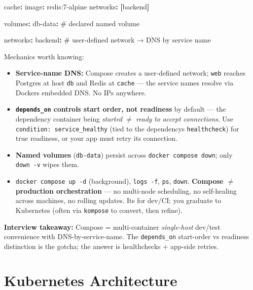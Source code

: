 \documentclass[11pt]{article}
\providecommand{\tightlist}{\setlength{\itemsep}{1pt}\setlength{\parskip}{0pt}}
\newenvironment{Shaded}{\begin{snugshade}}{\end{snugshade}}
\newcommand{\AttributeTok}[1]{\textcolor[rgb]{0.16,0.50,0.73}{#1}}
\newcommand{\CommentTok}[1]{\textcolor[rgb]{0.48,0.49,0.49}{#1}}
\newcommand{\FunctionTok}[1]{\textcolor[rgb]{0.56,0.27,0.68}{#1}}
\newcommand{\KeywordTok}[1]{\textcolor[rgb]{0.81,0.81,0.76}{\textbf{#1}}}
\begin{document}
\begin{Shaded}
\begin{Highlighting}[]
\AttributeTok{  }\FunctionTok{cache}\KeywordTok{:}
\AttributeTok{    }\FunctionTok{image}\KeywordTok{:}\AttributeTok{ redis:7{-}alpine}
\AttributeTok{    }\FunctionTok{networks}\KeywordTok{:}\AttributeTok{ }\KeywordTok{[}\AttributeTok{backend}\KeywordTok{]}

\FunctionTok{volumes}\KeywordTok{:}
\AttributeTok{  }\FunctionTok{db{-}data}\KeywordTok{:}\CommentTok{                          \# declared named volume}

\FunctionTok{networks}\KeywordTok{:}
\AttributeTok{  }\FunctionTok{backend}\KeywordTok{:}\CommentTok{                          \# user{-}defined network → DNS by service name}
\end{Highlighting}
\end{Shaded}

Mechanics worth knowing:

\begin{itemize}
\tightlist
\item
  \textbf{Service-name DNS:} Compose creates a user-defined network; \texttt{web} reaches Postgres at host \texttt{db} and Redis at \texttt{cache} --- the service names resolve via Docker\textquotesingle s embedded DNS. No IPs anywhere.
\item
  \textbf{\texttt{depends\_on} controls start order, not readiness} by default --- the dependency container being \emph{started} \(\neq\) \emph{ready to accept connections}. Use \texttt{condition:\ service\_healthy} (tied to the dependency\textquotesingle s \texttt{healthcheck}) for true readiness, or your app must retry its connection.
\item
  \textbf{Named volumes} (\texttt{db-data}) persist across \texttt{docker\ compose\ down}; only \texttt{down\ -v} wipes them.
\item
  \texttt{docker\ compose\ up\ -d} (background), \texttt{logs\ -f}, \texttt{ps}, \texttt{down}. \textbf{Compose \(\neq\) production orchestration} --- no multi-node scheduling, no self-healing across machines, no rolling updates. It\textquotesingle s for dev/CI; you graduate to Kubernetes (often via \texttt{kompose} to convert, then refine).
\end{itemize}

\textbf{Interview takeaway:} Compose = multi-container \emph{single-host} dev/test convenience with DNS-by-service-name. The \texttt{depends\_on} start-order vs readiness distinction is the gotcha; the answer is healthchecks + app-side retries.

\section{Kubernetes Architecture}\label{kubernetes-architecture}
\end{document}
